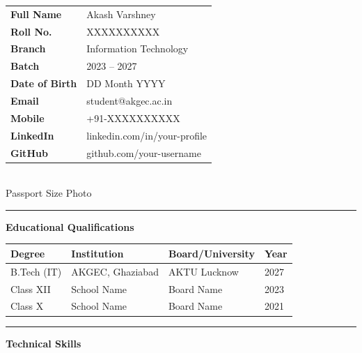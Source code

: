 \noindent
\begin{minipage}[t]{0.72\textwidth}
  \begin{tabular}{@{}p{3.5cm}p{7cm}}
    \textbf{Full Name}      & Akash Varshney \\[4pt]
    \textbf{Roll No.}       & XXXXXXXXXX \\[4pt]
    \textbf{Branch}         & Information Technology \\[4pt]
    \textbf{Batch}          & 2023 -- 2027 \\[4pt]
    \textbf{Date of Birth}  & DD Month YYYY \\[4pt]
    \textbf{Email}          & student@akgec.ac.in \\[4pt]
    \textbf{Mobile}         & +91-XXXXXXXXXX \\[4pt]
    \textbf{LinkedIn}       & linkedin.com/in/your-profile \\[4pt]
    \textbf{GitHub}         & github.com/your-username \\
  \end{tabular}
\end{minipage}
\hfill
\begin{minipage}[t]{0.24\textwidth}
  \centering
  \setlength{\fboxsep}{0pt}
  \fbox{\rule{3.5cm}{0pt}\rule{0pt}{4.5cm}}\\[2pt]
  {\small Passport Size Photo}
\end{minipage}

\vspace{0.5cm}\hrule\vspace{0.4cm}

\noindent\textbf{Educational Qualifications}
\vspace{0.2cm}

\begin{tabular}{@{}p{2.5cm}p{5cm}p{3cm}p{1.5cm}@{}}
\toprule
\textbf{Degree} & \textbf{Institution} & \textbf{Board/University} & \textbf{Year} \\
\midrule
B.Tech (IT)    & AKGEC, Ghaziabad       & AKTU Lucknow & 2027 \\
Class XII       & School Name            & Board Name   & 2023 \\
Class X         & School Name            & Board Name   & 2021 \\
\bottomrule
\end{tabular}

\vspace{0.4cm}\hrule\vspace{0.4cm}

\noindent\textbf{Technical Skills}
\vspace{0.2cm}

